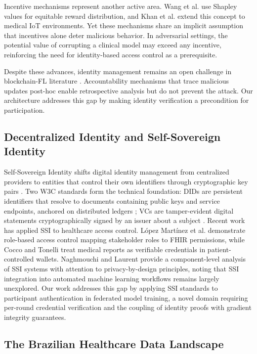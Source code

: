 \documentclass[english]{sbc2025}
\begin{document}
Incentive mechanisms represent another active area. Wang et al. \citep{wang2022blockchain} use Shapley values for equitable reward distribution, and Khan et al. \citep{khan2024rewardchain} extend this concept to medical IoT environments. Yet these mechanisms share an implicit assumption that incentives alone deter malicious behavior. In adversarial settings, the potential value of corrupting a clinical model may exceed any incentive, reinforcing the need for identity-based access control as a prerequisite.

Despite these advances, identity management remains an open challenge in blockchain-FL literature \citep{qammar2023securing}. Accountability mechanisms that trace malicious updates post-hoc \citep{lo2022trustworthy} enable retrospective analysis but do not prevent the attack. Our architecture addresses this gap by making identity verification a precondition for participation.

\subsection{Decentralized Identity and Self-Sovereign Identity}

Self-Sovereign Identity shifts digital identity management from centralized providers to entities that control their own identifiers through cryptographic key pairs \citep{Soltani}. Two W3C standards form the technical foundation: DIDs are persistent identifiers that resolve to documents containing public keys and service endpoints, anchored on distributed ledgers \citep{W3C_DID_2022}; VCs are tamper-evident digital statements cryptographically signed by an issuer about a subject \citep{W3C2019}. Recent work has applied SSI to healthcare access control. L\'{o}pez Mart\'{i}nez et al. \citep{MARTINEZ2026104020} demonstrate role-based access control mapping stakeholder roles to FHIR permissions, while Cocco and Tonelli \citep{fi16120473} treat medical reports as verifiable credentials in patient-controlled wallets. Naghmouchi and Laurent \citep{Naghmouchi} provide a component-level analysis of SSI systems with attention to privacy-by-design principles, noting that SSI integration into automated machine learning workflows remains largely unexplored. Our work addresses this gap by applying SSI standards to participant authentication in federated model training, a novel domain requiring per-round credential verification and the coupling of identity proofs with gradient integrity guarantees.

\subsection{The Brazilian Healthcare Data Landscape}
\end{document}
